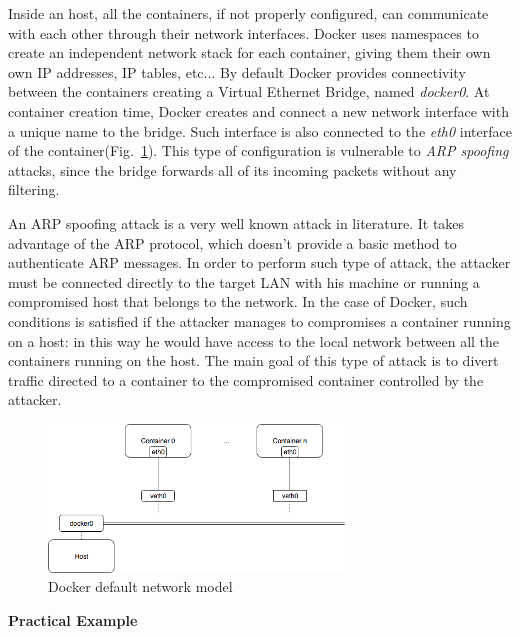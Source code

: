 \documentclass[a4paper,12pt]{article}
\def\myfig#1{Fig.~#1\xspace}
\begin{document}
Inside an host, all the containers, if not properly configured, can communicate
with each other through their network interfaces. Docker uses namespaces to
create an independent network stack for each container, giving them their own
own IP addresses, IP tables, etc... By default Docker provides connectivity
between the containers creating a Virtual Ethernet Bridge, named
\textit{docker0}. At container creation time, Docker creates and connect a new
network interface with a unique name to the bridge. Such interface is also
connected to the \textit{eth0} interface of the
container(\myfig{\ref{fig:docker_network_model}}). This type of configuration is
vulnerable to \textit{ARP spoofing} attacks, since the bridge forwards all of
its incoming packets without any filtering. \par An ARP spoofing attack is a
very well known attack in literature. It takes advantage of the ARP protocol,
which doesn't provide a basic method to authenticate ARP messages. In order to
perform such type of attack, the attacker must be connected directly to the
target LAN with his machine or running a compromised host that belongs to the
network. In the case of Docker, such conditions is satisfied if the attacker
manages to compromises a container running on a host: in this way he would have
access to the local network between all the containers running on the host. The
main goal of this type of attack is to divert traffic directed to a container to
the compromised container controlled by the attacker.   
\begin{figure}[ht!]
  \centerline{\includegraphics[width=0.7\textwidth]{docker-network-model.png}}
  \caption{Docker default network model}
  \label{fig:docker_network_model}
  \end{figure}

\bigbreak\textbf{Practical Example}\bigbreak 
\end{document}
